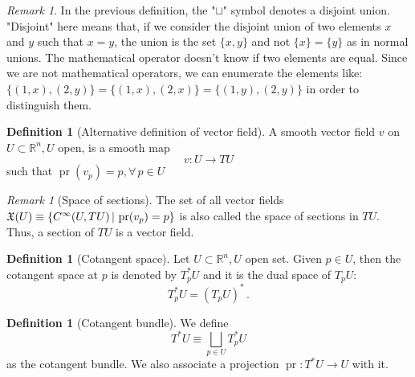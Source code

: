 \documentclass[a4paper,11pt,titlepage, article, oneside]{memoir}
\numberwithin{equation}{section}
\theoremstyle{definition}
\newtheorem{definition}[theorem]{Definition}
\theoremstyle{remark}
\newtheorem{remark}[theorem]{Remark}
\DeclareMathOperator{\pr}{pr}
\newcommand{\rfield}{\mathbb{R}}
\begin{document}
\begin{remarkbox}\begin{remark} \label{disjointrem}
  In the previous definition, the "$\sqcup$" symbol denotes a disjoint union. "Disjoint" here means that, if we consider the disjoint union of two elements $x$ and $y$ such that $x=y$, the union is the set $\{x, y\}$ and not $\{x\} = \{y\}$ as in normal unions. The mathematical operator doesn't know if two elements are equal. Since we are not mathematical operators, we can enumerate the elements like: $\{(1, x), (2, y)\} = \{(1, x), (2, x)\} = \{(1, y), (2, y)\}$ in order to distinguish them.
\end{remark}\end{remarkbox}

\begin{definition}[Alternative definition of vector field]
  A smooth vector field $v$ on $U \subset \rfield^n, U$ open, is a smooth map
  \begin{equation}
    v \colon U \rightarrow TU
  \end{equation}
  such that $\pr(v_p) = p, \forall \, p \in U$ %
\end{definition}

\begin{remarkbox}\begin{remark} [Space of sections]
  The set of all vector fields $\mathfrak{X}(U) \equiv \{ C^\infty(U, TU) \, | \\ \, \pr(v_p) = p \}$ is also called the space of sections in $TU$. Thus, a section of $TU$ is a vector field.
\end{remark}\end{remarkbox}

\begin{definition}[Cotangent space] \label{cotangentspace}
Let $U \subset \rfield^n, U$ open set. Given $p \in U$, then the cotangent space at $p$ is denoted by $T_p^* U$ and it is the dual space of $T_pU$:
\[ T_p^* U = (T_p U)^* \, . \] 
\end{definition}

\begin{definition} [Cotangent bundle]
  We define
  \begin{equation}
    T^*U \equiv \bigsqcup\limits_{p \in U} T_p^* U
  \end{equation}
  as the cotangent bundle. We also associate a projection $\pr \colon T^*U \rightarrow U$ with it.
\end{definition}
\end{document}
